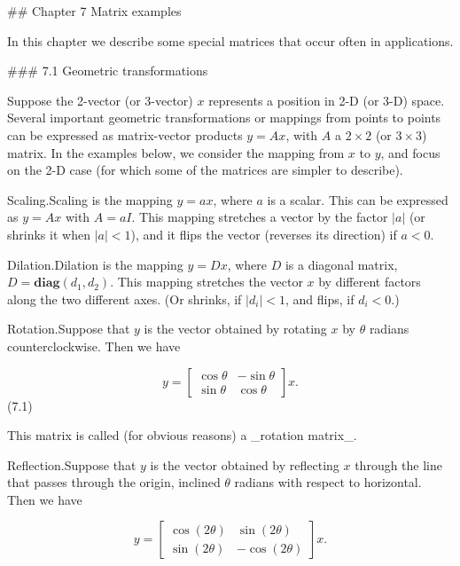 

## Chapter 7 Matrix examples

In this chapter we describe some special matrices that occur often in applications.

### 7.1 Geometric transformations

Suppose the 2-vector (or 3-vector) \(x\) represents a position in 2-D (or 3-D) space. Several important geometric transformations or mappings from points to points can be expressed as matrix-vector products \(y=Ax\), with \(A\) a \(2\times 2\) (or \(3\times 3\)) matrix. In the examples below, we consider the mapping from \(x\) to \(y\), and focus on the 2-D case (for which some of the matrices are simpler to describe).

Scaling.Scaling is the mapping \(y=ax\), where \(a\) is a scalar. This can be expressed as \(y=Ax\) with \(A=aI\). This mapping stretches a vector by the factor \(|a|\) (or shrinks it when \(|a|<1\)), and it flips the vector (reverses its direction) if \(a<0\).

Dilation.Dilation is the mapping \(y=Dx\), where \(D\) is a diagonal matrix, \(D=\mathbf{diag}(d_{1},d_{2})\). This mapping stretches the vector \(x\) by different factors along the two different axes. (Or shrinks, if \(|d_{i}|<1\), and flips, if \(d_{i}<0\).)

Rotation.Suppose that \(y\) is the vector obtained by rotating \(x\) by \(\theta\) radians counterclockwise. Then we have

\[y=\left[\begin{array}{cc}\cos\theta&-\sin\theta\\ \sin\theta&\cos\theta\end{array}\right]x.\] (7.1)

This matrix is called (for obvious reasons) a _rotation matrix_.

Reflection.Suppose that \(y\) is the vector obtained by reflecting \(x\) through the line that passes through the origin, inclined \(\theta\) radians with respect to horizontal. Then we have

\[y=\left[\begin{array}{cc}\cos(2\theta)&\sin(2\theta)\\ \sin(2\theta)&-\cos(2\theta)\end{array}\right]x.\]